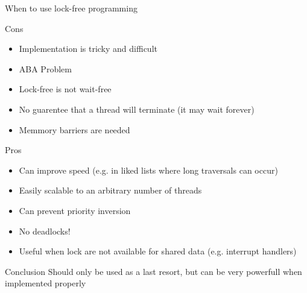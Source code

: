 \begin{frame}[allowframebreaks]{When to use lock-free programming}
    \begin{block}{Cons}
    \begin{itemize}
        \item Implementation is tricky and difficult
        \item ABA Problem
        \item Lock-free is \textcolor{ReneOrange}{not wait-free}
        \item No guarentee that a thread will terminate (it may wait forever)
        \item \textcolor{ReneOrange}{Memmory barriers} are needed
    \end{itemize}
    \end{block}

    \begin{block}{Pros}
    \begin{itemize}
        \item Can improve speed (e.g. in liked lists where long traversals can occur)
        \item Easily \textcolor{ReneOrange}{scalable} to an arbitrary number of threads
        \item Can prevent priority inversion
        \item \textcolor{ReneOrange}{No deadlocks!}
        \item Useful when lock are not available for shared data (e.g. interrupt handlers)
    \end{itemize}
    \end{block}
    
    \begin{exampleblock}{Conclusion}
        Should only be used as a last resort, but can be very powerfull when implemented properly
    \end{exampleblock}
\end{frame}
